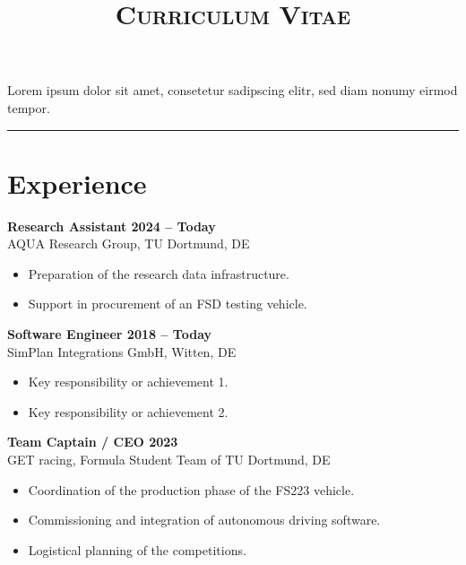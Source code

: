 \documentclass[a4paper,11pt]{article}
\newcommand{\col}[2]{\textcolor[HTML]{#1}{#2}}
\begin{document}
\begin{minipage}[t]{0.65\textwidth}
    \vspace{0cm}
    \begin{center}
        \title*{\Huge \textsc{\textbf{Curriculum Vitae}}}
    \end{center}

    Lorem ipsum dolor sit amet, consetetur sadipscing elitr, sed diam nonumy eirmod tempor.

    \vspace{0.5cm}
    \hrule

    \section*{\col{ac7448}{Experience}}
    \col{b27c52}{\textbf{Research Assistant \hfill 2024 -- Today}}\\
    AQUA Research Group, TU Dortmund, DE
    \begin{itemize}
        \small
        \item Preparation of the research data infrastructure.
        \item Support in procurement of an FSD testing vehicle.
    \end{itemize}

    \vspace{0.2cm}

    \col{b3805b}{\textbf{Software Engineer \hfill 2018 -- Today}} \\
    SimPlan Integrations GmbH, Witten, DE
    \begin{itemize}
        \small
        \item Key responsibility or achievement 1.
        \item Key responsibility or achievement 2.
    \end{itemize}

    \vspace{0.2cm}

    \col{b38668}{\textbf{Team Captain / CEO \hfill 2023}} \\
    GET racing, Formula Student Team of TU Dortmund, DE
    \begin{itemize}
        \small
        \item Coordination of the production phase of the FS223 vehicle.
        \item Commissioning and integration of autonomous driving software.
        \item Logistical planning of the competitions.
    \end{itemize}


\end{minipage}
\end{document}
